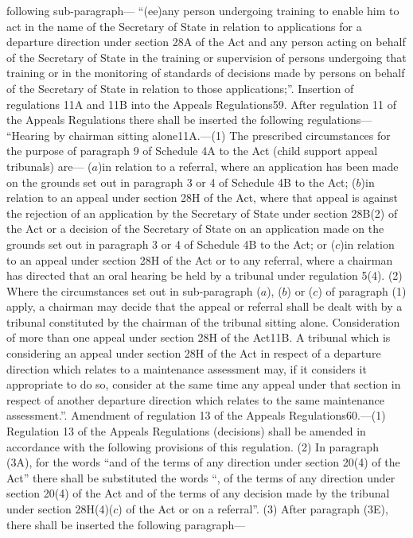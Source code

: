 \documentclass[a4paper]{article}
\begin{document}
following sub-paragraph—
“(ee)any person undergoing training to enable him to act in the name of the
Secretary of State in relation to applications for a departure direction under
section 28A of the Act and any person acting on behalf of the Secretary of State
in the training or supervision of persons undergoing that training or in the
monitoring of standards of decisions made by persons on behalf of the Secretary
of State in relation to those applications;”.
Insertion of regulations 11A and 11B into the Appeals Regulations59. After
regulation 11 of the Appeals Regulations there shall be inserted the following
regulations—
“Hearing by chairman sitting alone11A.—(1) The prescribed circumstances for the
purpose of paragraph 9 of Schedule 4A to the Act (child support appeal
tribunals) are—
($a$)in relation to a referral, where an application has been made on the grounds
set out in paragraph 3 or 4 of Schedule 4B to the Act;
($b$)in relation to an appeal under section 28H of the Act, where that appeal is
against the rejection of an application by the Secretary of State under section
28B(2) of the Act or a decision of the Secretary of State on an application made
on the grounds set out in paragraph 3 or 4 of Schedule 4B to the Act; or
($c$)in relation to an appeal under section 28H of the Act or to any referral,
where a chairman has directed that an oral hearing be held by a tribunal under
regulation 5(4).
(2) Where the circumstances set out in sub-paragraph ($a$), ($b$) or ($c$) of
paragraph (1) apply, a chairman may decide that the appeal or referral shall be
dealt with by a tribunal constituted by the chairman of the tribunal sitting
alone.
Consideration of more than one appeal under section 28H of the Act11B. A
tribunal which is considering an appeal under section 28H of the Act in respect
of a departure direction which relates to a maintenance assessment may, if it
considers it appropriate to do so, consider at the same time any appeal under
that section in respect of another departure direction which relates to the same
maintenance assessment.”.
Amendment of regulation 13 of the Appeals Regulations60.—(1) Regulation 13 of
the Appeals Regulations (decisions) shall be amended in accordance with the
following provisions of this regulation.
(2) In paragraph (3A), for the words “and of the terms of any direction under
section 20(4) of the Act” there shall be substituted the words “, of the terms
of any direction under section 20(4) of the Act and of the terms of any decision
made by the tribunal under section 28H(4)($c$) of the Act or on a referral”.
(3) After paragraph (3E), there shall be inserted the following paragraph—
\end{document}
